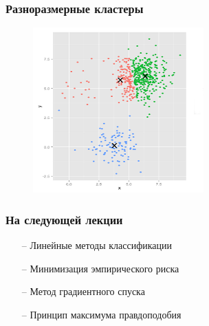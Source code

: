 \documentclass[12pt]{beamer}
\begin{document}
\begin{frame}\frametitle{Разноразмерные кластеры}
\begin{figure}[htbp]
  \includegraphics[height=180pt, keepaspectratio = true]{images/different_sizes-2}  
\end{figure}
\end{frame}

\begin{frame}\frametitle{На следующей лекции}
\begin{itemize}
\item[--] Линейные методы классификации
\item[--] Минимизация эмпирического риска
\item[--] Метод градиентного спуска
\item[--] Принцип максимума правдоподобия
\end{itemize}
\end{frame}
\end{document}

